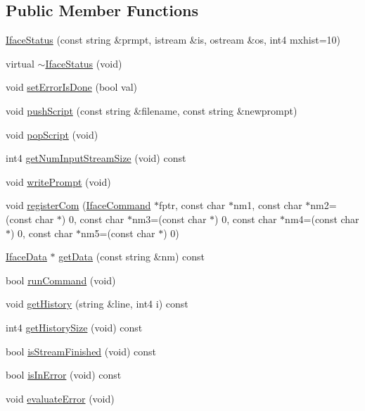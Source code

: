 \subsection*{Public Member Functions}
\begin{DoxyCompactItemize}
\item 
\mbox{\hyperlink{class_iface_status_ae5606b034f19ee24b4569946817b29c6}{Iface\+Status}} (const string \&prmpt, istream \&is, ostream \&os, int4 mxhist=10)
\item 
virtual \mbox{\hyperlink{class_iface_status_a152d9671686caf590fd91af5eb6e5b9a}{$\sim$\+Iface\+Status}} (void)
\item 
void \mbox{\hyperlink{class_iface_status_a3a987afd43c6bdaaeea9114b5d53129b}{set\+Error\+Is\+Done}} (bool val)
\item 
void \mbox{\hyperlink{class_iface_status_a4be96e0e55138d3b6a74496b6ae61a88}{push\+Script}} (const string \&filename, const string \&newprompt)
\item 
void \mbox{\hyperlink{class_iface_status_a8091c5bf341cfb11997893f0a35ba516}{pop\+Script}} (void)
\item 
int4 \mbox{\hyperlink{class_iface_status_acbc5b718b829b1cee5e0d9873cd641de}{get\+Num\+Input\+Stream\+Size}} (void) const
\item 
void \mbox{\hyperlink{class_iface_status_ad21c7aa49a8a30bc333c8d9e9effd73e}{write\+Prompt}} (void)
\item 
void \mbox{\hyperlink{class_iface_status_ad4fec227b244e8242fef9d36020a76fa}{register\+Com}} (\mbox{\hyperlink{class_iface_command}{Iface\+Command}} $\ast$fptr, const char $\ast$nm1, const char $\ast$nm2=(const char $\ast$) 0, const char $\ast$nm3=(const char $\ast$) 0, const char $\ast$nm4=(const char $\ast$) 0, const char $\ast$nm5=(const char $\ast$) 0)
\item 
\mbox{\hyperlink{class_iface_data}{Iface\+Data}} $\ast$ \mbox{\hyperlink{class_iface_status_af88322ddf5aa11ccdc483193a0a64152}{get\+Data}} (const string \&nm) const
\item 
bool \mbox{\hyperlink{class_iface_status_a78057db3e8cbf3c50cd1a6e4312892e5}{run\+Command}} (void)
\item 
void \mbox{\hyperlink{class_iface_status_a2ee164e918fff2ea7901fffa1fb6ad9b}{get\+History}} (string \&line, int4 i) const
\item 
int4 \mbox{\hyperlink{class_iface_status_aaf46b06f2ddb74f7e59ab6c13c9ce3db}{get\+History\+Size}} (void) const
\item 
bool \mbox{\hyperlink{class_iface_status_a916d4d648e2ddacd874c568d01c42763}{is\+Stream\+Finished}} (void) const
\item 
bool \mbox{\hyperlink{class_iface_status_a44e42915eec1a7c39b3153d0fe695b90}{is\+In\+Error}} (void) const
\item 
void \mbox{\hyperlink{class_iface_status_a07467671ab32029fffb11bad9f7c634e}{evaluate\+Error}} (void)
\end{DoxyCompactItemize}
